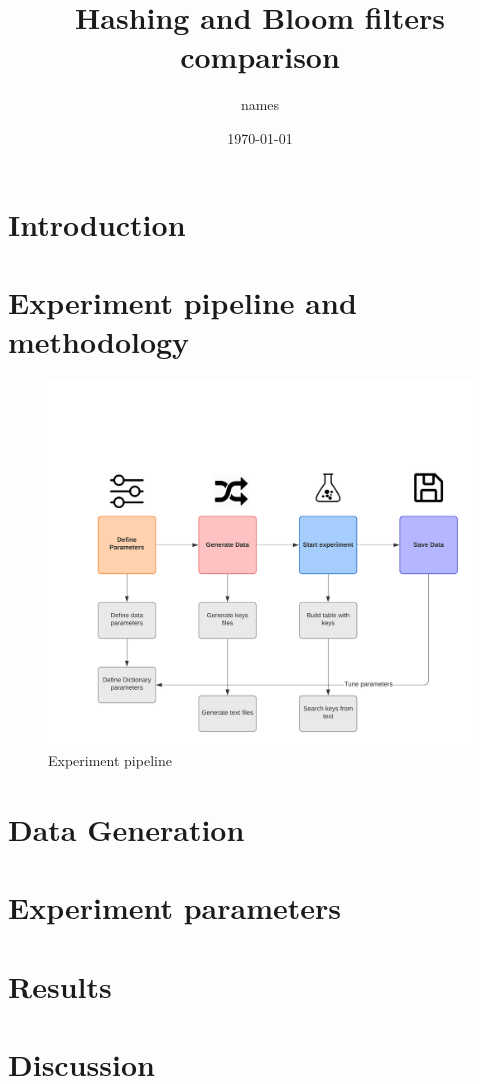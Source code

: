 \documentclass{article}
\title{Hashing and Bloom filters comparison}
\author{names}
\date{\today}
\begin{document}
    \maketitle
    \thispagestyle{empty}
    \begin{abstract}
        \lipsum[1]
    \end{abstract}


    \section*{Introduction}
        \lipsum[2]

    \section*{Experiment pipeline and methodology}
        \lipsum[1]
	\begin{figure}
	  \includegraphics[width=\linewidth]{experiment_pipeline.png}
	  \caption{Experiment pipeline}
	  \label{fig:Pipeline}
	\end{figure}
	\lipsum[1]
    \section*{Data Generation}
        \lipsum[1]
    \section*{Experiment parameters}
        \lipsum[1]
    \section*{Results}

    \section*{Discussion}
        \lipsum[1]


    \printbibliography
\end{document}
